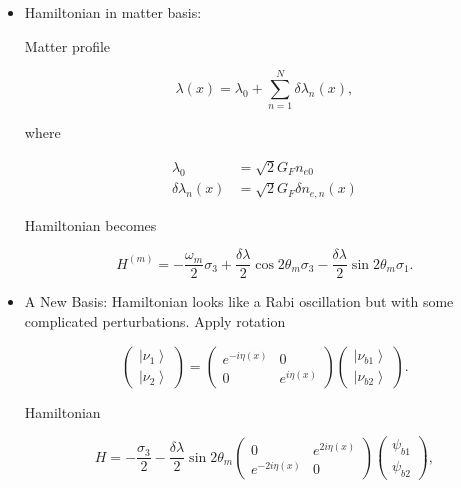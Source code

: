 \documentclass[%
preprint,
 amsmath,amssymb,
 aps,
]{revtex4-1}
\newcommand{\ket}[1]{\left| #1\right\rangle}
\begin{document}
\begin{itemize}
    \item Hamiltonian in matter basis:
    
    Matter profile

\begin{equation}
    \lambda(x) = \lambda_0 + \sum_{n=1}^{N} \delta \lambda_n (x),
\end{equation}

where

\begin{align}
    \lambda_0 &= \sqrt{2}G_F n_{e0} \\
    \delta \lambda_n(x) &= \sqrt{2}G_F \delta n_{e,n}(x)
\end{align}


Hamiltonian becomes

\begin{equation}
    H^{(m)} = - \frac{\omega_m}{2} \sigma_3 + \frac{\delta \lambda}{2} \cos 2\theta_m \sigma_3 - \frac{\delta \lambda}{2} \sin 2 \theta_m \sigma_1.
\end{equation}
    
    
    \item A New Basis: Hamiltonian looks like a Rabi oscillation but with some complicated perturbations.
    Apply rotation


\begin{equation}
\begin{pmatrix} \ket{\nu_1} \\ \ket{\nu_2} \end{pmatrix} = \begin{pmatrix} e^{-i \eta (x)} & 0 \\  0 & e^{i \eta (x)}  \end{pmatrix} \begin{pmatrix} \ket{\nu_{b1}} \\ \ket{\nu_{b2}} \end{pmatrix}.
\end{equation}

Hamiltonian

\begin{equation}
 H = -\frac{\sigma_3}{2} - \frac{\delta \lambda}{2} \sin 2\theta_m \begin{pmatrix} 0 & e^{2i\eta(x)} \\ e^{-2 i\eta(x) } & 0 \end{pmatrix}  \begin{pmatrix} \psi_{b1} \\ \psi_{b2} \end{pmatrix},
\end{equation}


\end{itemize}
\end{document}
